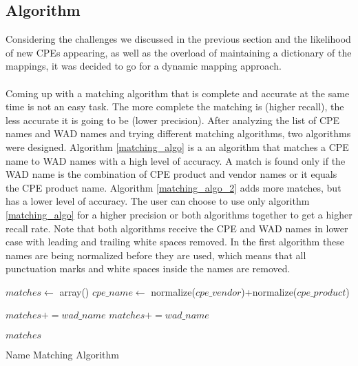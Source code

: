 \subsection{Algorithm}


Considering the challenges we discussed in the previous section and the likelihood of new CPEs appearing, as well as the overload of maintaining a dictionary of the mappings, it was decided to go for a dynamic mapping approach. 
\paragraph{}
Coming up with a matching algorithm that is complete and accurate at the same time is not an easy task. The more complete the matching is (higher recall), the less accurate it is going to be (lower precision). After analyzing the list of CPE names and WAD names and trying different matching algorithms, two algorithms were designed. Algorithm \ref{matching_algo} is a an algorithm that matches a CPE name to WAD names with a high level of accuracy. A match is found only if the WAD name is the combination of CPE product and vendor names or it equals the CPE product name. Algorithm \ref{matching_algo_2} adds more matches, but has a lower level of accuracy. The user can choose to use only algorithm \ref{matching_algo} for a higher precision or both algorithms together to get a higher recall rate. Note that both algorithms receive the CPE and WAD names in lower case with leading and trailing white spaces removed. In the first algorithm these names are being normalized before they are used, which means that all punctuation marks and white spaces inside the names are removed.  
\begin{algorithm}
\begin{algorithmic}
\STATE $matches\gets$ array()
\STATE $cpe\_name\gets$ normalize($cpe\_vendor$)+normalize($cpe\_product$)


		\STATE $matches+=wad\_name$
		\STATE $matches+=wad\_name$
		
		\ENDIF
\ENDFOR
\RETURN $matches$
%
%
%

\end{algorithmic}
\caption{Name Matching Algorithm}
\label{matching_algo}
\end{algorithm}

